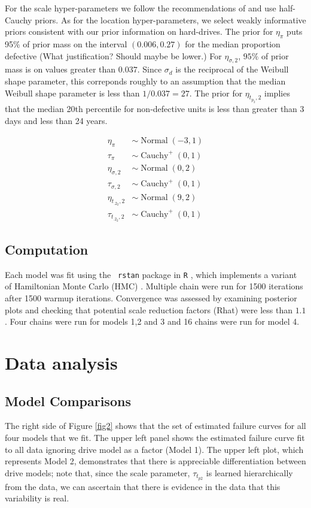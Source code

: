 \documentclass[12pt]{article}
\newcommand{\op}{\operatorname}
\begin{document}
For the scale hyper-parameters we follow the recommendations of \citet{gelman2014bayesian} and use half-Cauchy priors. As for the location hyper-parameters, we select weakly informative priors consistent with our prior information on hard-drives. The prior for $\eta_\pi$ puts 95\% of prior mass on the interval $(0.006, 0.27)$ for the median proportion defective (What justification? Should maybe be lower.) For $\eta_{\sigma, 2}$, $95\%$ of prior mass is on values greater than $0.037$. Since $\sigma_d$ is the reciprocal of the Weibull shape parameter, this correponds roughly to an assumption that the median Weibull shape parameter is less than $1/0.037 = 27$. The prior for $\eta_{t_{p_2},2}$ implies that the median 20th percentile for non-defective units is less than greater than 3 days and less than 24 years.

\begin{align*}
  \eta_{\pi} & \sim \op{Normal}(-3, 1)\\
  \tau_{\pi} & \sim \op{Cauchy}^+(0, 1)\\
  \eta_{\sigma ,2} & \sim \op{Normal}(0, 2)\\
  \tau_{\sigma ,2} & \sim \op{Cauchy}^+(0, 1)\\
  \eta_{t_{.2_2},2} & \sim \op{Normal}(9, 2)\\
  \tau_{t_{.2_2},2} & \sim \op{Cauchy}^+(0, 1)
 \end{align*} 

\subsection{Computation}
Each model was fit using the {\tt
  rstan}\cite{rstan} package in {\tt R} \cite{r}, which implements a variant of Hamiltonian Monte Carlo (HMC)
\cite{betancourt}. Multiple chain were run for 1500 iterations after 1500 warmup iterations. Convergence was assessed by examining posterior
plots and checking that potential scale reduction factors (Rhat) \cite{gelman2014bayesian} were less than $1.1$. Four chains were run for models 1,2 and 3 and 16 chains were run for model 4.

\section{Data analysis}


\subsection{Model Comparisons}
The right side of Figure \ref{fig2} shows that the set of estimated failure curves for all four models that we fit. The upper left panel shows the estimated failure curve fit to all data ignoring drive model as a factor (Model 1). The upper left plot, which represents Model 2, demonstrates that there is appreciable differentiation between drive models; note that, since the scale parameter, $\tau_{t_{p2}}$ is learned hierarchically from the data, we can ascertain that there is evidence in the data that this variability is real.
\end{document}
